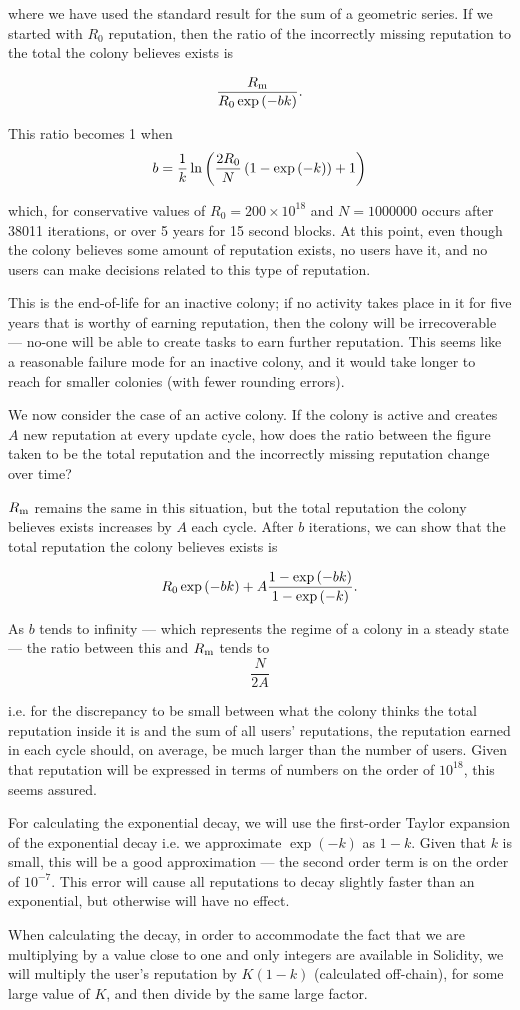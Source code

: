\noindent where we have used the standard result for the sum of a geometric series. If we started with $R_0$ reputation, then the ratio of the incorrectly missing reputation to the total the colony believes exists is

$$\frac{R_{\rm m}}{R_0\exp\left(-bk\right)}.$$


This ratio becomes 1 when
$$ b = \frac{1}{k}\ln\left(\frac{2R_{\rm 0}}{N}\left(1-\exp\left(-k\right)\right) +1   \right)$$


\noindent which, for conservative values of $R_0 = 200\times10^{18}$ and $N=1000000$ occurs after 38011 iterations, or over 5 years for 15 second blocks. At this point, even though the colony believes some amount of reputation exists, no users have it, and no users can make decisions related to this type of reputation.

This is the end-of-life for an inactive colony; if no activity takes place in it for five years that is worthy of earning reputation, then the colony will be irrecoverable --- no-one will be able to create tasks to earn further reputation. This seems like a reasonable failure mode for an inactive colony, and it would take longer to reach for smaller colonies (with fewer rounding errors). 

We now consider the case of an active colony. If the colony is active and creates $A$ new reputation at every update cycle, how does the ratio between the figure taken to be the total reputation and the incorrectly missing reputation change over time?

$R_{\rm m}$ remains the same in this situation, but the total reputation the colony believes exists increases by $A$ each cycle. After $b$ iterations, we can show that the total reputation the colony believes exists is

$$R_{\rm 0}\exp\left(-bk\right) + A\frac{1-\exp\left(-bk\right)}{1-\exp\left(-k\right)}.$$


As $b$ tends to infinity --- which represents the regime of a colony in a steady state --- the ratio between this and $R_{\rm m}$ tends to 
$$\frac{N}{2A}$$

\noindent i.e. for the discrepancy to be small between what the colony thinks the total reputation inside it is and the sum of all users' reputations, the reputation earned in each cycle should, on average, be much larger than the number of users. Given that reputation will be expressed in terms of numbers on the order of $10^{18}$, this seems assured.

For calculating the exponential decay, we will use the first-order Taylor expansion of the exponential decay i.e. we approximate $\exp\left(-k\right)$ as $1-k$. Given that $k$ is small, this will be a good approximation --- the second order term is on the order of $10^{-7}$. This error will cause all reputations to decay slightly faster than an exponential, but otherwise will have no effect.

When calculating the decay, in order to accommodate the fact that we are multiplying by a value close to one and only integers are available in Solidity, we will multiply the user's reputation by $K(1-k)$ (calculated off-chain), for some large value of $K$, and then divide by the same large factor.
